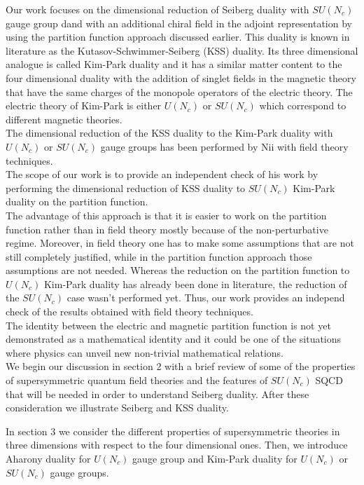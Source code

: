 Our work focuses on the dimensional reduction of Seiberg duality with $SU(N_c)$ gauge group 
dand with an additional chiral field in the adjoint representation by using the partition function approach discussed earlier.
This duality is known in literature as the Kutasov-Schwimmer-Seiberg (KSS) duality.
Its three dimensional analogue is called Kim-Park duality and it has a similar matter content to the four dimensional duality with the addition of singlet fields in the magnetic theory that have the same charges of the monopole operators of the electric theory.
The electric theory of Kim-Park is either $U(N_c)$ or $SU(N_c)$ which correspond to different magnetic theories. 
 \\
The dimensional reduction of the KSS duality to the Kim-Park duality with $U(N_c)$ or $SU(N_c)$ gauge groups has been performed by Nii with field theory techniques.\\
The scope of our work is to provide an independent check of his work by performing the dimensional reduction of KSS duality to $SU(N_c)$ Kim-Park duality on the partition function.\\
The advantage of this approach is that it is easier to work on the partition function rather than in field theory mostly because of the non-perturbative regime.
Moreover, in field theory one has to make some assumptions that are not still completely justified, while in the partition function approach those assumptions are not needed.
Whereas the reduction on the partition function to $U(N_c)$ Kim-Park duality has already been done in literature, the reduction of the $SU(N_c)$ case wasn't performed yet.
Thus, our work provides an independ check of the results obtained with field theory techniques.\\
The identity between the electric and magnetic partition function is not yet demonstrated as a mathematical identity and it could be one of the situations where physics can unveil new non-trivial mathematical relations. 
\\

\pagestyle{intro}
We begin our discussion in section 2 with a brief review of some of the properties of supersymmetric quantum field theories and the features of $SU(N_c)$ SQCD that will be needed in order to understand Seiberg duality.
After these consideration we illustrate Seiberg and KSS duality.
\thispagestyle{intro}

In section 3 we consider the different properties of supersymmetric theories in three dimensions with respect to the four dimensional ones.
Then, we introduce Aharony duality for $U(N_c)$ gauge group and Kim-Park duality for $U(N_c)$ or $SU(N_c)$ gauge groups.

